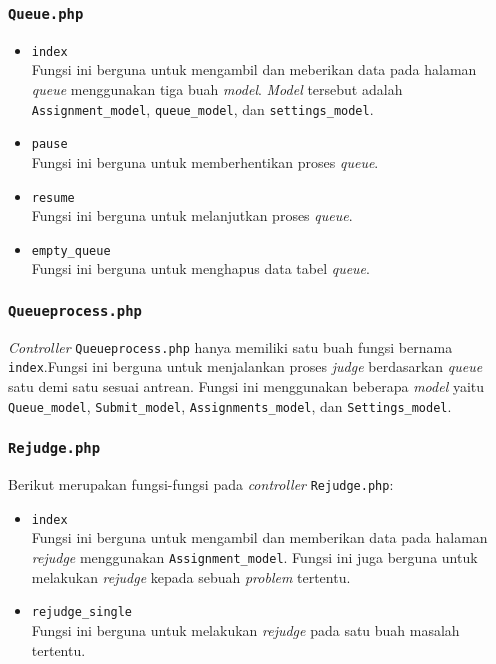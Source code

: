 \subsubsection{\texttt{Queue.php}}
\begin{itemize}
	\item \texttt{index}\\
	Fungsi ini berguna untuk mengambil dan meberikan data pada halaman \textit{queue} menggunakan tiga buah \textit{model}. \textit{Model} tersebut adalah \texttt{Assignment\_model}, \texttt{queue\_model}, dan \texttt{settings\_model}.
	\item \texttt{pause}\\
	Fungsi ini berguna untuk memberhentikan proses \textit{queue}.
	\item \texttt{resume}\\
	Fungsi ini berguna untuk melanjutkan proses \textit{queue}.
	\item \texttt{empty\_queue}\\
	Fungsi ini berguna untuk menghapus data tabel \textit{queue}.
\end{itemize}
\subsubsection{\texttt{Queueprocess.php}}
\textit{Controller} \texttt{Queueprocess.php} hanya memiliki satu buah fungsi bernama \texttt{index}.Fungsi ini berguna untuk menjalankan proses \textit{judge} berdasarkan \textit{queue} satu demi satu sesuai antrean. Fungsi ini menggunakan beberapa \textit{model} yaitu \texttt{Queue\_model}, \texttt{Submit\_model}, \texttt{Assignments\_model}, dan \texttt{Settings\_model}.
\subsubsection{\texttt{Rejudge.php}}
Berikut merupakan fungsi-fungsi pada \textit{controller} \texttt{Rejudge.php}:
\begin{itemize}
	\item \texttt{index}\\
	Fungsi ini berguna untuk mengambil dan memberikan data pada halaman \textit{rejudge} menggunakan \texttt{Assignment\_model}. Fungsi ini juga berguna untuk melakukan \textit{rejudge} kepada sebuah \textit{problem} tertentu.
	\item \texttt{rejudge\_single}\\
	Fungsi ini berguna untuk melakukan \textit{rejudge} pada satu buah masalah tertentu.
\end{itemize}
